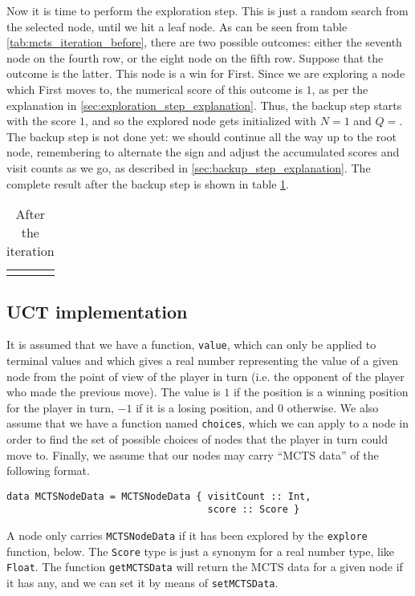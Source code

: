 Now it is time to perform the exploration step.
This is just a random search from the selected node, until we hit a leaf node.
As can be seen from table \ref{tab:mcts_iteration_before}, there are two possible outcomes: either the seventh node on the fourth row, or the eight node on the fifth row.
Suppose that the outcome is the latter.
This node is a win for First. Since we are exploring a node which First moves to, the numerical score of this outcome is $1$, as per the explanation in \ref{sec:exploration_step_explanation}.
Thus, the backup step starts with the score $1$, and so the explored node gets initialized with $N=1$ and $Q=$.
The backup step is not done yet: we should continue all the way up to the root node, remembering to alternate the sign and adjust the accumulated scores and visit counts as we go, as described in \ref{sec:backup_step_explanation}.
The complete result after the backup step is shown in table \ref{fig:mcts_iteration_after}.
\begin{center}
\def\arraystretch{5.5}
\begin{table}
\begin{tabular}{l}
  \def\svgwidth{\columnwidth} 
\end{tabular}
\caption{After the iteration}
\label{fig:mcts_iteration_after}
\end{table}
\end{center}

\subsection{UCT implementation}

It is assumed that we have a function, \texttt{value}, which can only be applied to terminal values and which gives a real number representing the value of a given node from the point of view of the player in turn (i.e. the opponent of the player who made the previous move). The value is $1$ if the position is a winning position for the player in turn, $-1$ if it is a losing position, and $0$ otherwise.
We also assume that we have a function named \texttt{choices}, which we can apply to a node in order to find the set of possible choices of nodes that the player in turn could move to. Finally, we assume that our nodes may carry ``MCTS data'' of the following format.
\begin{lstlisting}[frame=single]
data MCTSNodeData = MCTSNodeData { visitCount :: Int,
                                   score :: Score }
\end{lstlisting}
A node only carries \texttt{MCTSNodeData} if it has been explored by the \texttt{explore} function, below.
The \texttt{Score} type is just a synonym for a real number type, like \texttt{Float}. The function \texttt{getMCTSData} will return the MCTS data for a given node if it has any, and we can set it by means of \texttt{setMCTSData}.


